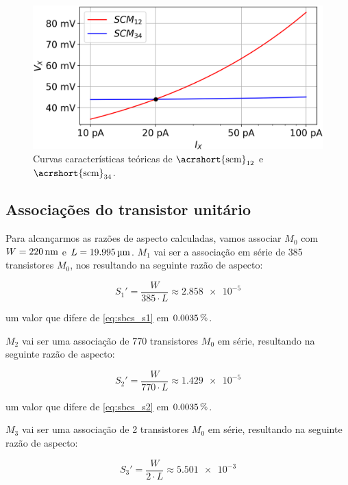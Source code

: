 \documentclass[10pt,a4paper]{extreport}
\newcommand{\?}{\stackrel{?}{=}}
\newcommand{\sis}[2]{\complexnum{#1}\,\si[per-mode=symbol]{#2}}
\newcommand{\mysize}{0.69}
\begin{document}
\begin{figure}[htp!]
    \includegraphics[width=\mysize\linewidth]{Imagens/scm_teorico.png}
    \centering
    \caption{Curvas características teóricas de $\text{\acrshort{scm}}_{12}$ e $\text{\acrshort{scm}}_{34}$.}
    \label{fig:scm_teorico}
\end{figure}

\subsection{Associações do transistor unitário}

Para alcançarmos as razões de aspecto calculadas, vamos associar $M_0$ com $W=\sis{220}{\nano\meter}$ e $L=\sis{19.995}{\micro\meter}$. $M_1$ vai ser a associação em série de 385 transistores $M_0$, nos resultando na seguinte razão de aspecto:

\begin{equation}
    \label{eq:associacao_s1}
    S_1'=\frac{W}{385\cdot L}\approx\num{2.858e-5}
\end{equation}

\noindent um valor que difere de \eqref{eq:sbcs_s1} em $\sis{0.0035}{\percent}$.

$M_2$ vai ser uma associação de 770 transistores $M_0$ em série, resultando na seguinte razão de aspecto:

\begin{equation}
    \label{eq:associacao_s2}
    S_2'=\frac{W}{770\cdot L}\approx\num{1.429e-5}
\end{equation}

\noindent um valor que difere de \eqref{eq:sbcs_s2} em $\sis{0.0035}{\percent}$.

$M_3$ vai ser uma associação de 2 transistores $M_0$ em série, resultando na seguinte razão de aspecto:

\begin{equation}
    \label{eq:associacao_s3}
    S_3'=\frac{W}{2\cdot L}\approx\num{5.501e-3}
\end{equation}
\end{document}
